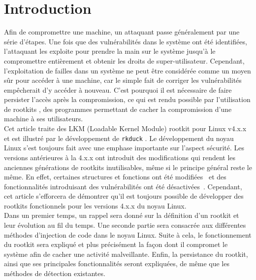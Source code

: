 \documentclass[12pt]{article}
\begin{document}
\newcommand*{\escape}[1]{\texttt{\textbackslash#1}}
\newcommand*{\escapeI}[1]{\texttt{\expandafter\string\csname #1\endcsname}}
\newcommand*{\escapeII}[1]{\texttt{\char`\\#1}}


\section*{Introduction}

    Afin de compromettre une machine, un attaquant passe généralement par une série d'étapes. Une fois que des vulnérabilités dans le système ont été identifiées, l'attaquant les exploite pour prendre la main sur le système jusqu'à le compromettre entièrement et obtenir les droits de super-utilisateur. Cependant, l'exploitation de failles dans un système ne peut être considérée comme un moyen sûr pour accéder à une machine, car le simple fait de corriger les vulnérabilités empêcherait d'y accéder à nouveau. C'est pourquoi il est nécessaire de faire persister l'accès après la compromission, ce qui est rendu possible par l'utilisation de rootkits \cite{turbochaos}\cite{zenk}, des programmes permettant de cacher la compromission d'une machine à ses utilisateurs. \\
    
    Cet article traite des LKM (Loadable Kernel Module) rootkit pour Linux v4.x.x et est illustré par le développement de \texttt{rkduck} . Le développement du noyau Linux s'est toujours fait avec une emphase importante sur l'aspect sécurité. Les versions antérieures à la 4.x.x ont introduit des modifications qui rendent les anciennes générations de rootkits inutilisables, même si le principe général reste le même. En effet, certaines structures et fonctions ont été modifiées~\cite{turbochaos2} et des fonctionnalités introduisant des vulnérabilités ont été désactivées~\cite{devmem-restrict}. Cependant, cet article s'efforcera de démontrer qu'il est toujours possible de développer des rootkits fonctionnels pour les versions 4.x.x du noyau Linux. \\

    Dans un premier temps, un rappel sera donné sur la définition d'un rootkit et leur évolution au fil du temps. Une seconde partie sera consacrée aux différentes méthodes d'injection de code dans le noyau Linux. Suite à cela, le fonctionnement du rootkit sera expliqué et plus précisément la façon dont il compromet le système afin de cacher une activité malveillante. Enfin, la persistance du rootkit, ainsi que ses principales fonctionnalités seront expliquées, de même que les méthodes de détection existantes.
\end{document}
